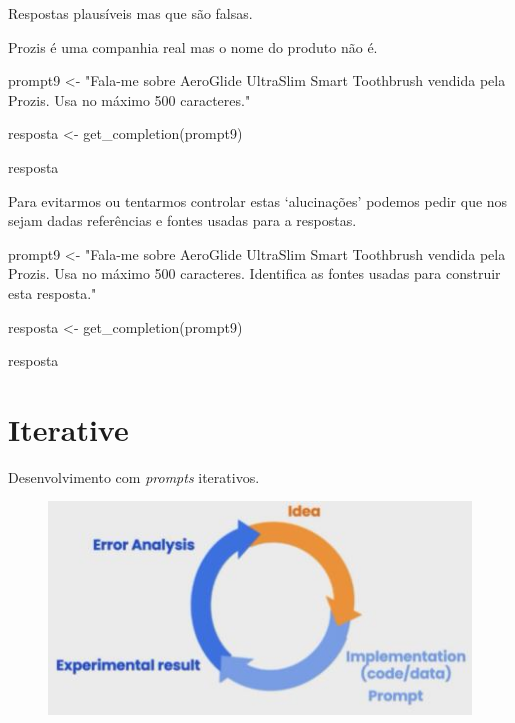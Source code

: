 \documentclass[
  letterpaper,
  paper=6in:9in,
  pagesize=pdftex,
  headinclude=on,
  footinclude=on,
  12pt]{scrbook}
\newenvironment{Shaded}{\begin{snugshade}}{\end{snugshade}}
\newcommand{\FunctionTok}[1]{\textcolor[rgb]{0.28,0.35,0.67}{#1}}
\newcommand{\NormalTok}[1]{\textcolor[rgb]{0.00,0.23,0.31}{#1}}
\newcommand{\OtherTok}[1]{\textcolor[rgb]{0.00,0.23,0.31}{#1}}
\newcommand{\StringTok}[1]{\textcolor[rgb]{0.13,0.47,0.30}{#1}}
\begin{document}
Respostas plausíveis mas que são falsas.

Prozis é uma companhia real mas o nome do produto não é.

\begin{Shaded}
\begin{Highlighting}[]
\NormalTok{prompt9 }\OtherTok{\textless{}{-}} \StringTok{"Fala{-}me sobre AeroGlide UltraSlim Smart Toothbrush vendida pela Prozis. }
\StringTok{Usa no máximo 500 caracteres."}

\NormalTok{resposta }\OtherTok{\textless{}{-}} \FunctionTok{get\_completion}\NormalTok{(prompt9)}

\NormalTok{resposta}
\end{Highlighting}
\end{Shaded}

Para evitarmos ou tentarmos controlar estas `alucinações' podemos pedir
que nos sejam dadas referências e fontes usadas para a respostas.

\begin{Shaded}
\begin{Highlighting}[]
\NormalTok{prompt9 }\OtherTok{\textless{}{-}} \StringTok{"Fala{-}me sobre AeroGlide UltraSlim Smart Toothbrush vendida pela Prozis. }
\StringTok{Usa no máximo 500 caracteres. Identifica as fontes usadas para construir esta resposta."}

\NormalTok{resposta }\OtherTok{\textless{}{-}} \FunctionTok{get\_completion}\NormalTok{(prompt9)}

\NormalTok{resposta}
\end{Highlighting}
\end{Shaded}


\hypertarget{iterative}{%
\chapter{Iterative}\label{iterative}}

Desenvolvimento com \emph{prompts} iterativos.

\begin{figure}[H]

{\centering \includegraphics{images/iterative.jpg}

}

\end{figure}
\end{document}
